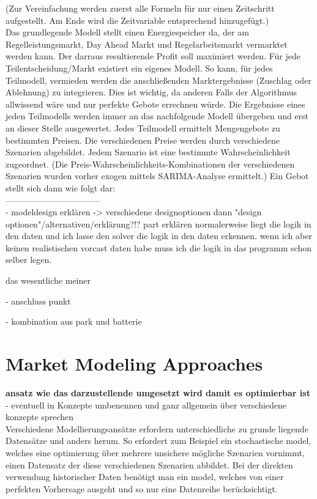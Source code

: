 (Zur Vereinfachung werden zuerst alle Formeln für nur einen Zeitschritt aufgestellt. Am Ende wird die Zeitvariable entsprechend hinzugefügt.)
\\
Das grundlegende Modell stellt einen Energiespeicher da, der am Regelleistungsmarkt, Day Ahead Markt und Regelarbeitsmarkt vermarktet werden kann.
Der darraus resultierende Profit soll maximiert werden. Für jede Teilentscheidung/Markt existiert ein eigenes Modell. So kann, für jedes Teilmodell,
vermieden werden die anschließenden Marktergebnisse (Zuschlag oder Ablehnung) zu integrieren. Dies ist wichtig, da anderen Falls der
Algorithmus allwissend wäre und nur perfekte Gebote errechnen würde. Die Ergebnisse eines jeden Teilmodells werden immer an das nachfolgende
Modell übergeben und erst an dieser Stelle ausgewertet. Jedes Teilmodell ermittelt Mengengebote zu bestimmten Preisen. Die verschiedenen Preise
werden durch verschiedene Szenarien abgebildet. Jedem Szenario ist eine bestimmte Wahrscheinlichkeit zugeordnet.
(Die Preis-Wahrscheinlichkeits-Kombinationen der verschiedenen Szenarien wurden vorher exogen mittels SARIMA-Analyse ermittelt.)
Ein Gebot stellt sich dann wie folgt dar:\\
---------------------------------\\

- modeldesign erklären
-> verschiedene designoptionen dann "design optionen"/alternativen/erklärung?!? part erklären
normalerweise liegt die logik in den daten und ich lasse den solver die logik in den daten erkennen.
wenn ich aber keinen realistischen vorcast daten habe muss ich die logik in das programm schon selber legen.

das wesentliche meiner

- anschluss punkt

- kombination aus park und batterie

\section{Market Modeling Approaches}
\textbf{ansatz wie das darzustellende umgesetzt wird damit es optimierbar ist} \\
- eventuell in Konzepte umbenennen und ganz allgemein über verschiedene konzepte sprechen\\

Verschiedene Modellierungsansätze erfordern unterschiedliche zu grunde liegende Datensätze und anders herum.
So erfordert zum Beispiel ein stochastische model, welches eine optimierung über mehrere unsichere mögliche Szenarien vornimmt,
einen Datensatz der diese verschiedenen Szenarien abbildet. Bei der direkten verwendung historischer Daten benötigt man ein model,
welches  von einer perfekten Vorhersage ausgeht und so nur eine Datenreihe berücksichtigt.

